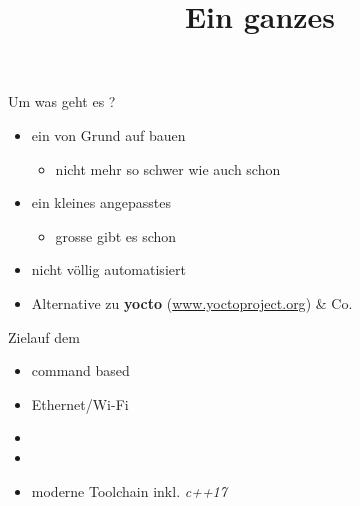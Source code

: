 \documentclass{beamer}
\begin{document}
\title[Build]{Ein ganzes \linux}

\frame{\titlepage}

\begin{frame}{Um was geht es ?}
 \begin{itemize}
  \item ein \linux von Grund auf bauen
  \begin{itemize}
   \item nicht mehr so schwer wie auch schon
  \end{itemize}
  \item ein kleines angepasstes \linux
  \begin{itemize}
   \item grosse \linux gibt es schon
  \end{itemize}
  \item nicht völlig automatisiert
  \item Alternative zu {\bf yocto} (\url{www.yoctoproject.org}) \& Co. 
 \end{itemize}
\end{frame}

\begin{frame}{Ziel}{\linux auf dem \target}
\begin{itemize}
 \item command based
 \item Ethernet/Wi-Fi
 \item {} 
 \item {}
 \item moderne Toolchain inkl. {\em c++17} \cpp
\end{itemize}
\end{frame}








%
%
\end{document}
